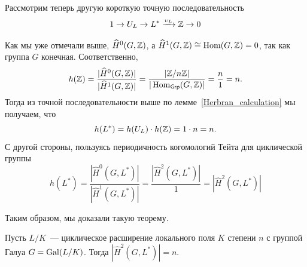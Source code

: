 	  Рассмотрим теперь другую короткую точную последовательность 
	  \[
	  	1 \to U_L \to L^* \xrightarrow{\upsilon_L} \mathbb{Z} \to 0
	  \]

	  Как мы уже отмечали выше, $\widehat{H}^0(G, \mathbb{Z})$, а $\widehat{H}^1(G, \mathbb{Z}) \cong \operatorname{Hom}(G, \mathbb{Z}) = 0$, так как группа $G$ конечная. Соответственно, 
	  \[
	  	h(\mathbb{Z}) = \frac{|\widehat{H}^0(G, \mathbb{Z})|}{|\widehat{H}^1(G, \mathbb{Z})|} = \frac{|\mathbb{Z}/n\mathbb{Z}|}{|\operatorname{Hom}_{\mathsf{Grp}}(G, \mathbb{Z})|} = \frac{n}{1} = n.
	  \]
	  Тогда из точной последовательности выше по лемме~\ref{Herbran_calculation} мы получаем, что 
	  \[
	  	h(L^*) = h(U_L) \cdot h(\mathbb{Z}) = 1 \cdot n = n.
	  \]
	  С другой стороны, пользуясь периодичность когомологий Тейта для циклической группы
	  \[
	  		h(L^*) = \frac{|\widehat{H}^0(G, L^*)|}{|\widehat{H}^1(G, L^*)|} = \frac{|\widehat{H}^2(G, L^*)|}{1} = |\widehat{H}^2(G, L^*)|
	  \]

	  Таким образом, мы доказали такую теорему. 

	  \begin{theorem} 
	  	Пусть $L/K$~--- циклическое расширение локального поля $K$ степени $n$ с группой Галуа $G = \operatorname{Gal}(L/K)$.  Тогда $|\widehat{H}^2(G, L^*)| = n$. 
	  \end{theorem}

	  
